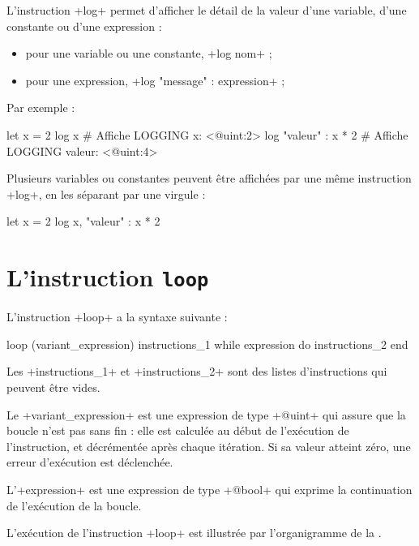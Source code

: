 
L'instruction \ggs+log+ permet d'afficher le détail de la valeur d'une variable, d'une constante ou d'une expression :
\begin{itemize}
  \item pour une variable ou une constante, \ggs+log nom+ ;
  \item pour une expression, \ggs+log "message" : expression+ ;
\end{itemize}

Par exemple :
\begin{galgas}
let x = 2
log x # Affiche LOGGING x: <@uint:2>
log "valeur" : x * 2 # Affiche LOGGING valeur: <@uint:4>
\end{galgas}

Plusieurs variables ou constantes peuvent être affichées par une même instruction \ggs+log+, en les séparant par une virgule :
\begin{galgas}
let x = 2
log x, "valeur" : x * 2
\end{galgas}














\section{L'instruction \texttt{loop}}


L'instruction \ggs+loop+ a la syntaxe suivante :
\begin{galgasbox}
loop (variant_expression)
  instructions_1
while expression do
  instructions_2
end
\end{galgasbox}


Les \ggs+instructions_1+ et \ggs+instructions_2+ sont des listes d'instructions qui peuvent être vides.


Le \ggs+variant_expression+ est une expression de type \ggs+@uint+ qui assure que la boucle n'est pas sans fin : elle est calculée au début de l'exécution de l'instruction, et décrémentée après chaque itération. Si sa valeur atteint zéro, une erreur d'exécution est déclenchée.

L'\ggs+expression+ est une expression de type \ggs+@bool+ qui exprime la continuation de l'exécution de la boucle.

L'exécution de l'instruction \ggs+loop+ est illustrée par l'organigramme de la .


